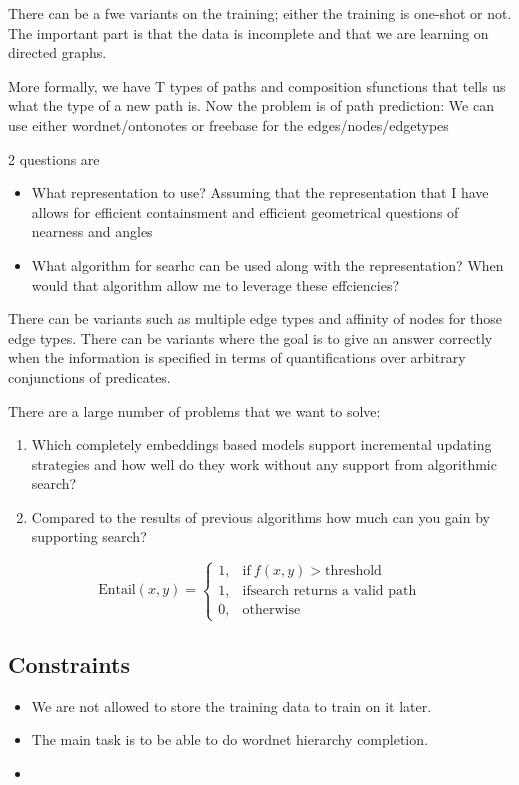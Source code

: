 \documentclass[11pt]{article}
\begin{document}
There can be a fwe variants on the training; either the training is
one-shot or not. The important part is that the data is incomplete and
that we are learning on directed graphs.

More formally, we have T types of paths and composition sfunctions
that tells us what the type of a new path is. Now the problem is of
path prediction: We can use either wordnet/ontonotes or freebase for
the edges/nodes/edgetypes

2 questions are
\begin{itemize}
\item What representation to use? Assuming that the representation
  that I have allows for efficient containsment and efficient
  geometrical questions of nearness and angles
\item What algorithm for searhc can be used along with the
  representation? When would that algorithm allow me to leverage these effciencies?
\end{itemize}

There can be variants such as multiple edge types and affinity of
nodes for those edge types. There can be variants where the goal is to
give an answer correctly when the information is specified in terms of
quantifications over arbitrary conjunctions of predicates.

There are a large number of problems that we want to solve:

\begin{enumerate}
\item Which completely embeddings based models support incremental
  updating strategies and how well do they work without any support
  from algorithmic search?
\item Compared to the results of previous algorithms how much can you
  gain by supporting search?
\end{enumerate}
{
  \begin{equation*}
    \text{Entail}(x, y) =
    \begin{cases}
      1, & \text{if}\ f(x,y) > \text{threshold} \\
      1, & \text{if} \text{search returns a valid path} \\
      0, & \text{otherwise}
    \end{cases}
  \end{equation*}
}

\subsection{Constraints}
\label{sec:constraints}

\begin{itemize}
\item We are not allowed to store the training data to train on it later.
\item The main task is to be able to do wordnet hierarchy completion.
\item
\end{itemize}





\end{document}
